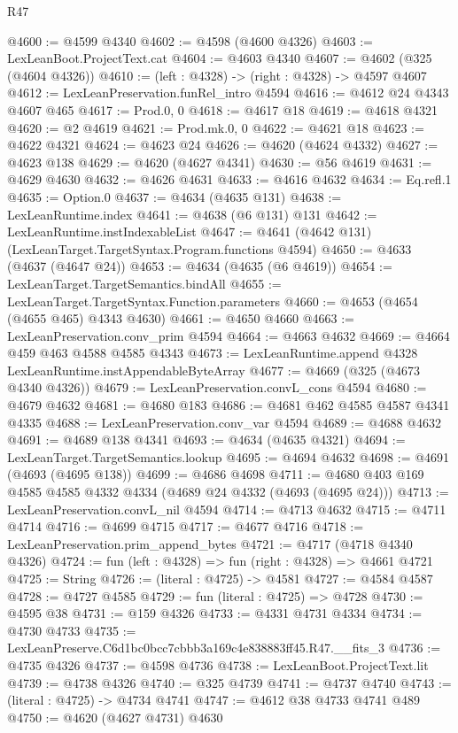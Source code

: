 \begin{lexlean}{R47}
\begin{coremodule}
@4600 := @4599 @4340
@4602 := @4598 (@4600 @4326)
@4603 := LexLeanBoot.ProjectText.cat
@4604 := @4603 @4340
@4607 := @4602 (@325 (@4604 @4326))
@4610 := (left : @4328) -> (right : @4328) -> @4597 @4607
@4612 := LexLeanPreservation.funRel_intro @4594
@4616 := @4612 @24 @4343 @4607 @465
@4617 := Prod.{0, 0}
@4618 := @4617 @18
@4619 := @4618 @4321
@4620 := @2 @4619
@4621 := Prod.mk.{0, 0}
@4622 := @4621 @18
@4623 := @4622 @4321
@4624 := @4623 @24
@4626 := @4620 (@4624 @4332)
@4627 := @4623 @138
@4629 := @4620 (@4627 @4341)
@4630 := @56 @4619
@4631 := @4629 @4630
@4632 := @4626 @4631
@4633 := @4616 @4632
@4634 := Eq.refl.{1}
@4635 := Option.{0}
@4637 := @4634 (@4635 @131)
@4638 := LexLeanRuntime.index
@4641 := @4638 (@6 @131) @131
@4642 := LexLeanRuntime.instIndexableList
@4647 := @4641 (@4642 @131) (LexLeanTarget.TargetSyntax.Program.functions @4594)
@4650 := @4633 (@4637 (@4647 @24))
@4653 := @4634 (@4635 (@6 @4619))
@4654 := LexLeanTarget.TargetSemantics.bindAll
@4655 := LexLeanTarget.TargetSyntax.Function.parameters
@4660 := @4653 (@4654 (@4655 @465) @4343 @4630)
@4661 := @4650 @4660
@4663 := LexLeanPreservation.conv_prim @4594
@4664 := @4663 @4632
@4669 := @4664 @459 @463 @4588 @4585 @4343
@4673 := LexLeanRuntime.append @4328 LexLeanRuntime.instAppendableByteArray
@4677 := @4669 (@325 (@4673 @4340 @4326))
@4679 := LexLeanPreservation.convL_cons @4594
@4680 := @4679 @4632
@4681 := @4680 @183
@4686 := @4681 @462 @4585 @4587 @4341 @4335
@4688 := LexLeanPreservation.conv_var @4594
@4689 := @4688 @4632
@4691 := @4689 @138 @4341
@4693 := @4634 (@4635 @4321)
@4694 := LexLeanTarget.TargetSemantics.lookup
@4695 := @4694 @4632
@4698 := @4691 (@4693 (@4695 @138))
@4699 := @4686 @4698
@4711 := @4680 @403 @169 @4585 @4585 @4332 @4334 (@4689 @24 @4332 (@4693 (@4695 @24)))
@4713 := LexLeanPreservation.convL_nil @4594
@4714 := @4713 @4632
@4715 := @4711 @4714
@4716 := @4699 @4715
@4717 := @4677 @4716
@4718 := LexLeanPreservation.prim_append_bytes
@4721 := @4717 (@4718 @4340 @4326)
@4724 := fun (left : @4328) => fun (right : @4328) => @4661 @4721
@4725 := String
@4726 := (literal : @4725) -> @4581
@4727 := @4584 @4587
@4728 := @4727 @4585
@4729 := fun (literal : @4725) => @4728
@4730 := @4595 @38
@4731 := @159 @4326
@4733 := @4331 @4731 @4334
@4734 := @4730 @4733
@4735 := LexLeanPreserve.C6d1bc0bcc7cbbb3a169c4e838883ff45.R47.__fits_3
@4736 := @4735 @4326
@4737 := @4598 @4736
@4738 := LexLeanBoot.ProjectText.lit
@4739 := @4738 @4326
@4740 := @325 @4739
@4741 := @4737 @4740
@4743 := (literal : @4725) -> @4734 @4741
@4747 := @4612 @38 @4733 @4741 @489
@4750 := @4620 (@4627 @4731) @4630

\end{coremodule}
\end{lexlean}
